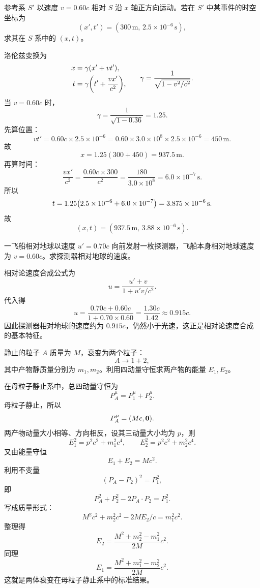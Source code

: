 \begin{university}
参考系 $S'$ 以速度 $v=0.60c$ 相对 $S$ 沿 $x$ 轴正方向运动。若在 $S'$ 中某事件的时空坐标为
\[
(x',t')=(300\,\mathrm{m},\,2.5\times 10^{-6}\,\mathrm{s}),
\]
求其在 $S$ 系中的 $(x,t)$。
\begin{solution}
洛伦兹变换为
\[
\begin{aligned}
  x&=\gamma(x'+vt'),\\
  t&=\gamma\qty(t'+\frac{vx'}{c^2}),
\end{aligned}
\qquad
\gamma=\frac{1}{\sqrt{1-v^2/c^2}}.
\]
当 $v=0.60c$ 时，
\[
\gamma=\frac{1}{\sqrt{1-0.36}}=1.25.
\]
先算位置：
\[
vt'=0.60c\times 2.5\times 10^{-6}
=0.60\times 3.0\times 10^8\times 2.5\times 10^{-6}
=450\,\mathrm{m}.
\]
故
\[
x=1.25(300+450)=937.5\,\mathrm{m}.
\]
再算时间：
\[
\frac{vx'}{c^2}=\frac{0.60c\times 300}{c^2}=\frac{180}{3.0\times 10^8}
=6.0\times 10^{-7}\,\mathrm{s}.
\]
所以
\[
t=1.25\qty(2.5\times 10^{-6}+6.0\times 10^{-7})
=3.875\times 10^{-6}\,\mathrm{s}.
\]
故
\[
(x,t)=(937.5\,\mathrm{m},\,3.88\times 10^{-6}\,\mathrm{s}).
\]
\end{solution}
\end{university}

\begin{university}
一飞船相对地球以速度 $u'=0.70c$ 向前发射一枚探测器，飞船本身相对地球速度为 $v=0.60c$。求探测器相对地球的速度。
\begin{solution}
相对论速度合成公式为
\[
 u=\frac{u'+v}{1+u'v/c^2}.
\]
代入得
\[
 u=\frac{0.70c+0.60c}{1+0.70\times 0.60}
 =\frac{1.30c}{1.42}
 \approx 0.915c.
\]
因此探测器相对地球的速度约为 $0.915c$，仍然小于光速，这正是相对论速度合成的基本特征。
\end{solution}
\end{university}

\begin{university}
静止的粒子 $A$ 质量为 $M$，衰变为两个粒子：
\[
A\to 1+2,
\]
其中产物静质量分别为 $m_1,m_2$。利用四动量守恒求两产物的能量 $E_1,E_2$。
\begin{solution}
在母粒子静止系中，总四动量守恒为
\[
P_A^\mu=P_1^\mu+P_2^\mu.
\]
母粒子静止，所以
\[
P_A^\mu=\qty(Mc,\vb{0}).
\]
两产物动量大小相等、方向相反，设其三动量大小均为 $p$，则
\[
E_1^2=p^2c^2+m_1^2c^4,
\qquad
E_2^2=p^2c^2+m_2^2c^4.
\]
又由能量守恒
\[
E_1+E_2=Mc^2.
\]
利用不变量
\[
(P_A-P_2)^2=P_1^2,
\]
即
\[
P_A^2+P_2^2-2P_A\cdot P_2=P_1^2.
\]
写成质量形式：
\[
M^2c^2+m_2^2c^2-2ME_2/c=m_1^2c^2.
\]
整理得
\[
E_2=\frac{M^2+m_2^2-m_1^2}{2M}c^2.
\]
同理
\[
E_1=\frac{M^2+m_1^2-m_2^2}{2M}c^2.
\]
这就是两体衰变在母粒子静止系中的标准结果。
\end{solution}
\end{university}

